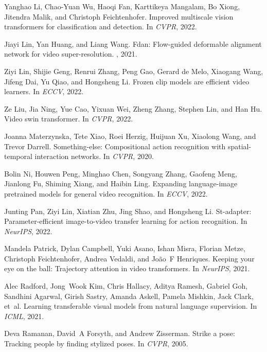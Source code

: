\documentclass[10pt,twocolumn,letterpaper]{article}
\begin{document}
{\begin{thebibliography}{10}
Yanghao Li, Chao-Yuan Wu, Haoqi Fan, Karttikeya Mangalam, Bo Xiong, Jitendra
  Malik, and Christoph Feichtenhofer.
\newblock Improved multiscale vision transformers for classification and
  detection.
\newblock In {\em CVPR}, 2022.

Jiayi Lin, Yan Huang, and Liang Wang.
\newblock Fdan: Flow-guided deformable alignment network for video
  super-resolution.
, 2021.

Ziyi Lin, Shijie Geng, Renrui Zhang, Peng Gao, Gerard de Melo, Xiaogang Wang,
  Jifeng Dai, Yu Qiao, and Hongsheng Li.
\newblock Frozen clip models are efficient video learners.
\newblock In {\em ECCV}, 2022.

Ze Liu, Jia Ning, Yue Cao, Yixuan Wei, Zheng Zhang, Stephen Lin, and Han Hu.
\newblock Video swin transformer.
\newblock In {\em CVPR}, 2022.

Joanna Materzynska, Tete Xiao, Roei Herzig, Huijuan Xu, Xiaolong Wang, and
  Trevor Darrell.
\newblock Something-else: Compositional action recognition with
  spatial-temporal interaction networks.
\newblock In {\em CVPR}, 2020.

Bolin Ni, Houwen Peng, Minghao Chen, Songyang Zhang, Gaofeng Meng, Jianlong Fu,
  Shiming Xiang, and Haibin Ling.
\newblock Expanding language-image pretrained models for general video
  recognition.
\newblock In {\em ECCV}, 2022.

Junting Pan, Ziyi Lin, Xiatian Zhu, Jing Shao, and Hongsheng Li.
\newblock St-adapter: Parameter-efficient image-to-video transfer learning for
  action recognition.
\newblock In {\em NeurIPS}, 2022.

Mandela Patrick, Dylan Campbell, Yuki Asano, Ishan Misra, Florian Metze,
  Christoph Feichtenhofer, Andrea Vedaldi, and Jo{\~a}o~F Henriques.
\newblock Keeping your eye on the ball: Trajectory attention in video
  transformers.
\newblock In {\em NeurIPS}, 2021.

Alec Radford, Jong~Wook Kim, Chris Hallacy, Aditya Ramesh, Gabriel Goh,
  Sandhini Agarwal, Girish Sastry, Amanda Askell, Pamela Mishkin, Jack Clark,
  et~al.
\newblock Learning transferable visual models from natural language
  supervision.
\newblock In {\em ICML}, 2021.

Deva Ramanan, David~A Forsyth, and Andrew Zisserman.
\newblock Strike a pose: Tracking people by finding stylized poses.
\newblock In {\em CVPR}, 2005.


\end{thebibliography}}
\end{document}
